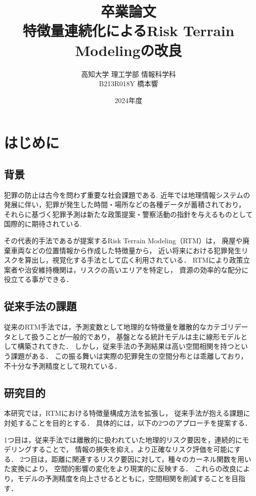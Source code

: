\documentclass[12pt,a4paper,oneside]{jsbook}
\title{
卒業論文\\[1.5cm]
特徴量連続化によるRisk Terrain Modelingの改良\\[6cm]
}
\author{高知大学 理工学部 情報科学科\\[0.5cm]
B213R018Y 橋本響}
\date{2024年度}
\theoremstyle{plain}
\begin{document}
\maketitle
\tableofcontents

\chapter{はじめに}
\label{chapter_1}
\section{背景}
犯罪の防止は古今を問わず重要な社会課題である.
近年では地理情報システムの発展に伴い，犯罪が発生した時間・場所などの各種データが蓄積されており，
それらに基づく犯罪予測は新たな政策提案・警察活動の指針を与えるものとして国際的に期待されている.

その代表的手法である\citet{caplan2015risk}が提案するRisk Terrain Modeling（RTM）は，
廃屋や廃棄車両などの位置情報から作成した特徴量から，
近い将来における犯罪発生リスクを算出し，視覚化する手法として広く利用されている．
RTMにより政策立案者や治安維持機関は，リスクの高いエリアを特定し，
資源の効率的な配分に役立てる事ができる．

\section{従来手法の課題}
従来のRTM手法では，予測変数として地理的な特徴量を離散的なカテゴリデータとして扱うことが一般的であり，
基盤となる統計モデルは主に線形モデルとして構築されてきた．
しかし，従来手法の予測結果は高い空間相関を持つという課題がある．
この振る舞いは実際の犯罪発生の空間分布とは乖離しており，不十分な予測精度として現れている．

\section{研究目的}
本研究では，RTMにおける特徴量構成方法を拡張し，
従来手法が抱える課題に対処することを目的とする．
具体的には，以下の2つのアプローチを提案する．

1つ目は，従来手法では離散的に扱われていた地理的リスク要因を，連続的にモデリングすることで，
情報の損失を抑え，より正確なリスク評価を可能にする． 
2つ目は，距離に関連するリスク要因に対して，種々のカーネル関数を用いた変換により，
空間的影響の変化をより現実的に反映する．
これらの改良により，モデルの予測精度を向上させるとともに，空間相関を削減することを目指す．
\end{document}

